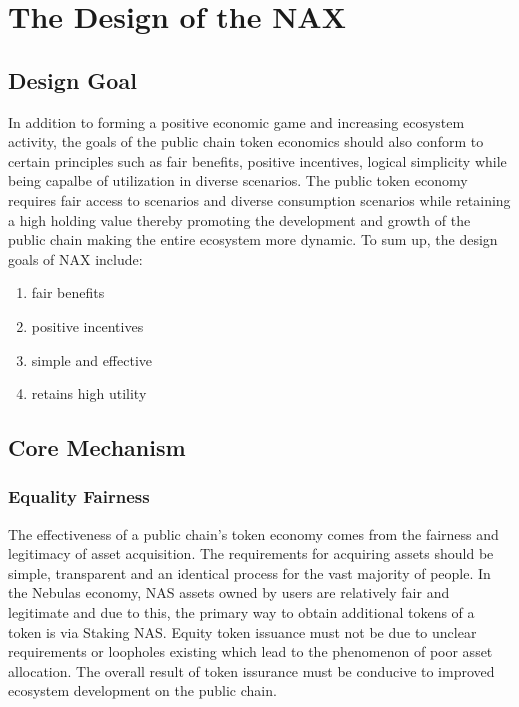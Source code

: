 \section{The Design of the NAX}
\subsection{Design Goal}
In addition to forming a positive economic game and increasing ecosystem activity, the goals of the public chain token economics should also conform to certain principles such as fair benefits, positive incentives, logical simplicity while being capalbe of utilization in diverse scenarios. The public token economy requires fair access to scenarios and diverse consumption scenarios while retaining a high holding value thereby promoting the development and growth of the public chain making the entire ecosystem more dynamic. To sum up, the design goals of NAX include:

\begin{enumerate}[\hspace{2cm}(a)]
    \item fair benefits
    \item positive incentives
    \item simple and effective
    \item retains high utility
\end{enumerate}

\subsection{Core Mechanism}

\subsubsection{Equality Fairness}
The effectiveness of a public chain's token economy comes from the fairness and legitimacy of asset acquisition. The requirements for acquiring assets should be simple, transparent and an identical process for the vast majority of people. In the Nebulas economy, NAS assets owned by users are relatively fair and legitimate and due to this, the primary way to obtain additional tokens of a token is via Staking NAS. Equity token issuance must not be due to unclear requirements or loopholes existing which lead to the phenomenon of poor asset allocation. The overall result of token issurance must be conducive to improved ecosystem development on the public chain.

